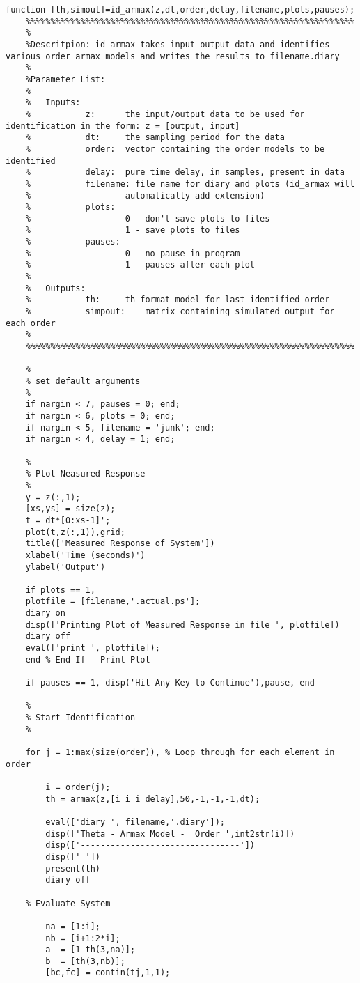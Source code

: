 \begin{lstlisting}[gobble=4]
	function [th,simout]=id_armax(z,dt,order,delay,filename,plots,pauses);
	%%%%%%%%%%%%%%%%%%%%%%%%%%%%%%%%%%%%%%%%%%%%%%%%%%%%%%%%%%%%%%%%%%
	%
	%Descritpion: id_armax takes input-output data and identifies various order armax models and writes the results to filename.diary
	%
	%Parameter List:
	%
	%	Inputs:
	%			z:		the input/output data to be used for identification in the form: z = [output, input]
	%			dt:		the sampling period for the data
	%			order:	vector containing the order models to be identified
	%			delay:	pure time delay, in samples, present in data
	%			filename: file name for diary and plots (id_armax will
	%					automatically add extension)
	%			plots: 
	%					0 - don't save plots to files
	%					1 - save plots to files
	%			pauses:
	%					0 - no pause in program
	%					1 - pauses after each plot
	%
	%	Outputs:
	%			th:		th-format model for last identified order
	%			simpout:	matrix containing simulated output for each order
	%
	%%%%%%%%%%%%%%%%%%%%%%%%%%%%%%%%%%%%%%%%%%%%%%%%%%%%%%%%%%%%%%%%%%
	
	%
	% set default arguments
	%
	if nargin < 7, pauses = 0; end;
	if nargin < 6, plots = 0; end;
	if nargin < 5, filename = 'junk'; end;
	if nargin < 4, delay = 1; end;
	
	%
	% Plot Neasured Response
	%
	y = z(:,1);
	[xs,ys] = size(z);
	t = dt*[0:xs-1]';
	plot(t,z(:,1)),grid;
	title(['Measured Response of System'])
	xlabel('Time (seconds)')
	ylabel('Output')
	
	if plots == 1,
	plotfile = [filename,'.actual.ps'];
	diary on
	disp(['Printing Plot of Measured Response in file ', plotfile])
	diary off
	eval(['print ', plotfile]);
	end % End If - Print Plot
	
	if pauses == 1, disp('Hit Any Key to Continue'),pause, end
	
	%
	% Start Identification
	%
	
	for j = 1:max(size(order)), % Loop through for each element in order
		
		i = order(j);
		th = armax(z,[i i i delay],50,-1,-1,-1,dt);
		
		eval(['diary ', filename,'.diary']);
		disp(['Theta - Armax Model -  Order ',int2str(i)])
		disp(['--------------------------------'])
		disp([' '])
		present(th)
		diary off
		
	% Evaluate System
		
		na = [1:i];
		nb = [i+1:2*i];
		a  = [1 th(3,na)];
		b  = [th(3,nb)];
		[bc,fc] = contin(tj,1,1);
		

\end{lstlisting}
